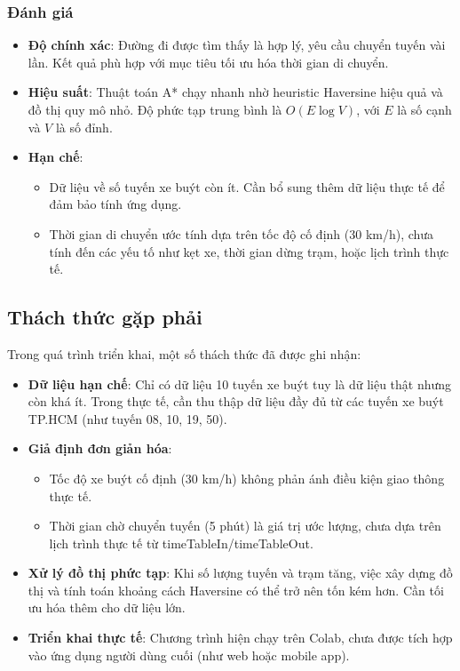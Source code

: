 \documentclass[a4paper,12pt]{article}
\begin{document}
\subsubsection{Đánh giá}

\begin{itemize}
    \item \textbf{Độ chính xác}: Đường đi được tìm thấy là hợp lý, yêu cầu chuyển tuyến vài lần. Kết quả phù hợp với mục tiêu tối ưu hóa thời gian di chuyển.
    
    \item \textbf{Hiệu suất}: Thuật toán A* chạy nhanh nhờ heuristic Haversine hiệu quả và đồ thị quy mô nhỏ. Độ phức tạp trung bình là $O(E \log V)$, với $E$ là số cạnh và $V$ là số đỉnh.
    
    \item \textbf{Hạn chế}: 
    \begin{itemize}
        \item Dữ liệu về số tuyến xe buýt còn ít. Cần bổ sung thêm dữ liệu thực tế để đảm bảo tính ứng dụng.
        \item Thời gian di chuyển ước tính dựa trên tốc độ cố định (30 km/h), chưa tính đến các yếu tố như kẹt xe, thời gian dừng trạm, hoặc lịch trình thực tế.
    \end{itemize}
\end{itemize}

\subsection{Thách thức gặp phải}
Trong quá trình triển khai, một số thách thức đã được ghi nhận:

\begin{itemize}
    \item \textbf{Dữ liệu hạn chế}: Chỉ có dữ liệu 10 tuyến xe buýt tuy là dữ liệu thật nhưng còn khá ít. Trong thực tế, cần thu thập dữ liệu đầy đủ từ các tuyến xe buýt TP.HCM (như tuyến 08, 10, 19, 50).
    
    \item \textbf{Giả định đơn giản hóa}:
    \begin{itemize}
        \item Tốc độ xe buýt cố định (30 km/h) không phản ánh điều kiện giao thông thực tế.
        \item Thời gian chờ chuyển tuyến (5 phút) là giá trị ước lượng, chưa dựa trên lịch trình thực tế từ timeTableIn/timeTableOut.
    \end{itemize}
    
    \item \textbf{Xử lý đồ thị phức tạp}: Khi số lượng tuyến và trạm tăng, việc xây dựng đồ thị và tính toán khoảng cách Haversine có thể trở nên tốn kém hơn. Cần tối ưu hóa thêm cho dữ liệu lớn.
    
    \item \textbf{Triển khai thực tế}: Chương trình hiện chạy trên Colab, chưa được tích hợp vào ứng dụng người dùng cuối (như web hoặc mobile app).
\end{itemize}
\end{document}

